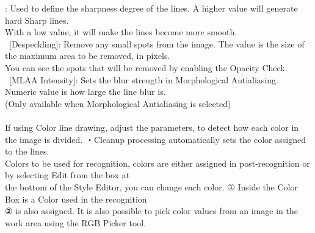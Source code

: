 \documentclass[a4paper,10pt]{article}
\begin{document}
\newpage

\noindent [Sharpness]: Used to define the sharpness degree of the lines. A higher value will generate hard Sharp lines.\\
With a low value, it will make the lines become more smooth.\\
\ [Despeckling]: Remove any small spots from the image. The value is the size of the maximum area to be removed, in pixels.\\
You can see the spots that will be removed by enabling the Opacity Check.\\
\ [MLAA Intensity]: Sets the blur strength in Morphological Antialiasing. Numeric value is how large the line blur is.\\
(Only available when Morphological Antialiasing is selected)\\
\\
\small
If using Color line drawing, adjust the parameters, to detect how each color in the image is divided.
\footnotesize
・Cleanup processing automatically sets the color assigned to the lines.\\
Colors to be used for recognition, colors are either assigned in post-recognition or by selecting Edit from the box at\\
the bottom of the Style Editor, you can change each color. ①  Inside the Color Box is a Color used in the recognition\\
② is also assigned. It is also possible to pick color values from an image in the work area using the RGB Picker tool.
\end{document}
